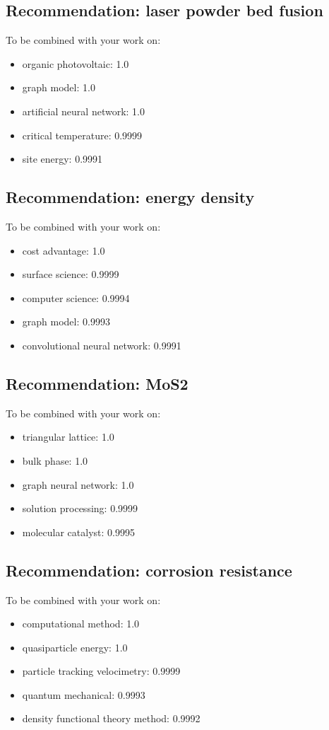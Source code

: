 \documentclass{article}%
\begin{document}
%
\subsection{Recommendation: laser powder bed fusion}%
\label{subsec:Recommendationlaserpowderbedfusion}%
To be combined with your work on:%
\begin{itemize}%
\item%
organic photovoltaic: 1.0%
\item%
graph model: 1.0%
\item%
artificial neural network: 1.0%
\item%
critical temperature: 0.9999%
\item%
site energy: 0.9991%
\end{itemize}

%
\subsection{Recommendation: energy density}%
\label{subsec:Recommendationenergydensity}%
To be combined with your work on:%
\begin{itemize}%
\item%
cost advantage: 1.0%
\item%
surface science: 0.9999%
\item%
computer science: 0.9994%
\item%
graph model: 0.9993%
\item%
convolutional neural network: 0.9991%
\end{itemize}

%
\subsection{Recommendation: MoS2}%
\label{subsec:RecommendationMoS2}%
To be combined with your work on:%
\begin{itemize}%
\item%
triangular lattice: 1.0%
\item%
bulk phase: 1.0%
\item%
graph neural network: 1.0%
\item%
solution processing: 0.9999%
\item%
molecular catalyst: 0.9995%
\end{itemize}

%
\subsection{Recommendation: corrosion resistance}%
\label{subsec:Recommendationcorrosionresistance}%
To be combined with your work on:%
\begin{itemize}%
\item%
computational method: 1.0%
\item%
quasiparticle energy: 1.0%
\item%
particle tracking velocimetry: 0.9999%
\item%
quantum mechanical: 0.9993%
\item%
density functional theory method: 0.9992%
\end{itemize}
\end{document}
